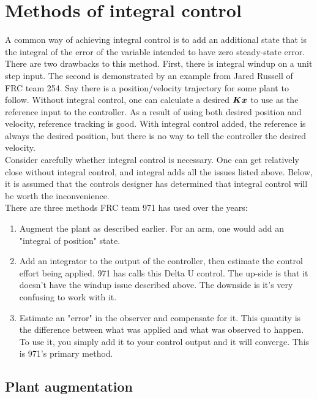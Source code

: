 \section{Methods of integral control} \label{sec:integral_control}

A common way of achieving integral control is to add an additional state that is
the integral of the error of the variable intended to have zero steady-state
error. \\

There are two drawbacks to this method. First, there is integral windup on a
unit step input. The second is demonstrated by an example from Jared Russell of
FRC team 254. Say there is a position/velocity trajectory for some plant to
follow. Without integral control, one can calculate a desired $\bm K\bm x$
to use as the reference input to the controller. As a result of using both
desired position and velocity, reference tracking is good. With integral control
added, the reference is always the desired position, but there is no way to tell
the controller the desired velocity. \\

Consider carefully whether integral control is necessary. One can get relatively
close without integral control, and integral adds all the issues listed above.
Below, it is assumed that the controls designer has determined that integral
control will be worth the inconvenience. \\

There are three methods FRC team 971 has used over the years:

\begin{enumerate}
  \item Augment the plant as described earlier. For an arm, one would add an
    "integral of position" state.
  \item Add an integrator to the output of the controller, then estimate the
    control effort being applied. 971 has calls this Delta U control. The
    up-side is that it doesn't have the windup issue described above. The
    downside is it's very confusing to work with it.
  \item Estimate an "error" in the observer and compensate for it. This quantity
    is the difference between what was applied and what was observed to happen.
    To use it, you simply add it to your control output and it will converge.
    This is 971's primary method.
\end{enumerate}

\subsection{Plant augmentation}


